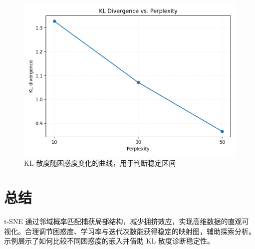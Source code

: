 \documentclass[UTF8,zihao=-4]{ctexart}
\begin{document}
\begin{figure}[H]
  \centering
  \includegraphics[width=0.8\linewidth]{tsne_perplexity_curve.png}
  \caption{KL 散度随困惑度变化的曲线，用于判断稳定区间}
  \label{fig:tsne_perplexity_curve_cn}
\end{figure}

\FloatBarrier
\section{总结}
t-SNE 通过邻域概率匹配捕获局部结构，减少拥挤效应，实现高维数据的直观可视化。合理调节困惑度、学习率与迭代次数能获得稳定的映射图，辅助探索分析。示例展示了如何比较不同困惑度的嵌入并借助 KL 散度诊断稳定性。
\end{document}
